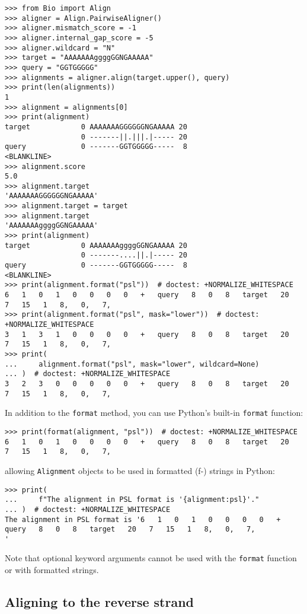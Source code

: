 \begin{itemize}
\begin{verbatim}
>>> from Bio import Align
>>> aligner = Align.PairwiseAligner()
>>> aligner.mismatch_score = -1
>>> aligner.internal_gap_score = -5
>>> aligner.wildcard = "N"
>>> target = "AAAAAAAggggGGNGAAAAA"
>>> query = "GGTGGGGG"
>>> alignments = aligner.align(target.upper(), query)
>>> print(len(alignments))
1
>>> alignment = alignments[0]
>>> print(alignment)
target            0 AAAAAAAGGGGGGNGAAAAA 20
                  0 -------||.|||.|----- 20
query             0 -------GGTGGGGG-----  8
<BLANKLINE>
>>> alignment.score
5.0
>>> alignment.target
'AAAAAAAGGGGGGNGAAAAA'
>>> alignment.target = target
>>> alignment.target
'AAAAAAAggggGGNGAAAAA'
>>> print(alignment)
target            0 AAAAAAAggggGGNGAAAAA 20
                  0 -------....||.|----- 20
query             0 -------GGTGGGGG-----  8
<BLANKLINE>
>>> print(alignment.format("psl"))  # doctest: +NORMALIZE_WHITESPACE
6   1   0   1   0   0   0   0   +   query   8   0   8   target   20   7   15   1   8,   0,   7,
>>> print(alignment.format("psl", mask="lower"))  # doctest: +NORMALIZE_WHITESPACE
3   1   3   1   0   0   0   0   +   query   8   0   8   target   20   7   15   1   8,   0,   7,
>>> print(
...     alignment.format("psl", mask="lower", wildcard=None)
... )  # doctest: +NORMALIZE_WHITESPACE
3   2   3   0   0   0   0   0   +   query   8   0   8   target   20   7   15   1   8,   0,   7,
\end{verbatim}
\end{itemize}

In addition to the \verb+format+ method, you can use Python's built-in \verb+format+ function:
\begin{verbatim}
>>> print(format(alignment, "psl"))  # doctest: +NORMALIZE_WHITESPACE
6   1   0   1   0   0   0   0   +   query   8   0   8   target   20   7   15   1   8,   0,   7,
\end{verbatim}
allowing \verb+Alignment+ objects to be used in formatted (f-) strings in Python:
\begin{verbatim}
>>> print(
...     f"The alignment in PSL format is '{alignment:psl}'."
... )  # doctest: +NORMALIZE_WHITESPACE
The alignment in PSL format is '6   1   0   1   0   0   0   0   +   query   8   0   8   target   20   7   15   1   8,   0,   7,
'
\end{verbatim}
Note that optional keyword arguments cannot be used with the \verb+format+ function or with formatted strings.

\subsection{Aligning to the reverse strand}
\label{sec:pairwise-general-gapscores}

